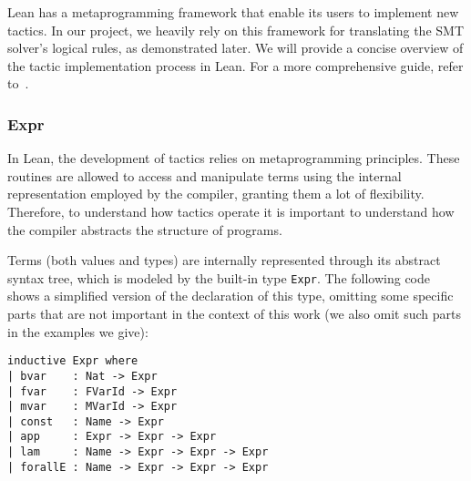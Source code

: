 Lean has a metaprogramming framework that enable its users to implement new tactics. In our project, we heavily rely on this framework for translating the SMT solver's logical rules, as demonstrated later. We will provide a concise overview of the tactic implementation process in Lean. For a more comprehensive guide, refer to~\cite{metaLean}.

\subsubsection{Expr}

In Lean, the development of tactics relies on metaprogramming principles. These routines are allowed to access and manipulate terms using the internal representation employed by the compiler, granting them a lot of flexibility. Therefore, to understand how tactics operate it is important to understand how the compiler abstracts the structure of programs.

Terms (both values and types) are internally represented through its abstract syntax tree, which is modeled by the built-in type \texttt{Expr}. The following code shows a simplified version of the declaration of this type, omitting some specific parts that are not important in the context of this work (we also omit such parts in the examples we give):

\begin{verbatim}
inductive Expr where
| bvar    : Nat -> Expr
| fvar    : FVarId -> Expr
| mvar    : MVarId -> Expr
| const   : Name -> Expr
| app     : Expr -> Expr -> Expr
| lam     : Name -> Expr -> Expr -> Expr
| forallE : Name -> Expr -> Expr -> Expr
\end{verbatim}

